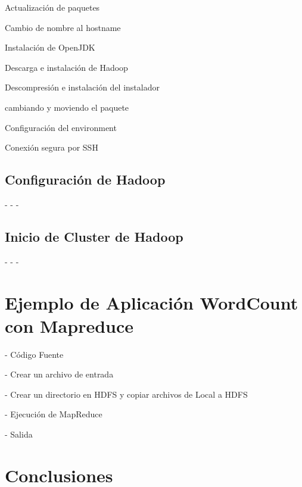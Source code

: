 Actualización de paquetes


Cambio de nombre al hostname

Instalación de OpenJDK


Descarga e instalación de Hadoop


Descompresión e instalación del instalador

cambiando y moviendo el paquete

Configuración del environment

Conexión segura por SSH

 

\subsection{Configuración de Hadoop}


-
-
-

\subsection{Inicio de Cluster de Hadoop}

-
-
-





\section{Ejemplo de Aplicación WordCount con Mapreduce}

- Código Fuente

- Crear un archivo de entrada


- Crear un directorio en HDFS y copiar archivos de Local a HDFS


- Ejecución de MapReduce

- Salida



\section{Conclusiones}
\clearpage
 